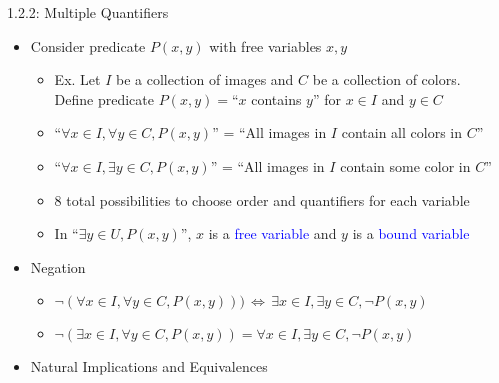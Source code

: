 \documentclass[10pt,english]{beamer}
\begin{document}
\begin{frame}{1.2.2: Multiple Quantifiers}



\begin{itemize}
\setlength\itemsep{3mm}
\item<1-> Consider predicate $P(x,y)$ with free variables $x,y$ \vspace{1mm}
\begin{itemize}
 \setlength\itemsep{1.5mm}
 \item Ex. Let $I$ be a collection of images and $C$ be a collection of colors. \\ Define predicate $P(x,y)=$``$x$ contains $y$'' for $x\in I$ and $y\in C$ 
 \item ``$\forall x\!\in\! I, \forall y\!\in\! C, P(x,y)$'' = ``All images in $I$ contain all colors in $C$''
 \item ``$\forall x\!\in\! I, \exists y \!\in\! C, P(x,y)$'' = ``All images in $I$ contain some color in $C$''
 \item 8 total possibilities to choose order and quantifiers for each variable
 \item In ``$\exists y \in U, P(x,y)$'', $x$ is a \textcolor{blue}{free variable} and $y$ is a \textcolor{blue}{bound variable}
\end{itemize}

\item<2-> Negation \vspace{1mm}
\begin{itemize}
 \setlength\itemsep{1.5mm}
 \item $\neg (\forall x\!\in\! I, \forall y\!\in\! C, P(x,y))) \,\Leftrightarrow\, \exists x\!\in\! I, \exists y\!\in\! C, \neg P(x,y)$
 \item $\neg (\exists x\!\in\! I, \forall y\!\in\! C, P(x,y)) = \forall x\!\in\! I, \exists y\!\in\! C, \neg P(x,y)$
\end{itemize}  
\item<2-> Natural Implications and Equivalences \vspace{1mm}


\end{itemize}
\end{frame}
\end{document}
